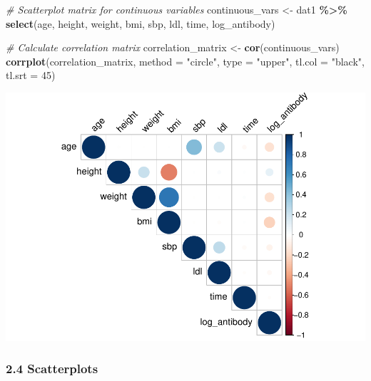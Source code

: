 \documentclass[
]{article}
\newenvironment{Shaded}{\begin{snugshade}}{\end{snugshade}}
\newcommand{\AttributeTok}[1]{\textcolor[rgb]{0.13,0.29,0.53}{#1}}
\newcommand{\CommentTok}[1]{\textcolor[rgb]{0.56,0.35,0.01}{\textit{#1}}}
\newcommand{\DecValTok}[1]{\textcolor[rgb]{0.00,0.00,0.81}{#1}}
\newcommand{\FunctionTok}[1]{\textcolor[rgb]{0.13,0.29,0.53}{\textbf{#1}}}
\newcommand{\NormalTok}[1]{#1}
\newcommand{\OtherTok}[1]{\textcolor[rgb]{0.56,0.35,0.01}{#1}}
\newcommand{\SpecialCharTok}[1]{\textcolor[rgb]{0.81,0.36,0.00}{\textbf{#1}}}
\newcommand{\StringTok}[1]{\textcolor[rgb]{0.31,0.60,0.02}{#1}}
\begin{document}
\begin{Shaded}
\begin{Highlighting}[]
\CommentTok{\# Scatterplot matrix for continuous variables}
\NormalTok{continuous\_vars }\OtherTok{\textless{}{-}}\NormalTok{ dat1 }\SpecialCharTok{\%\textgreater{}\%} 
  \FunctionTok{select}\NormalTok{(age, height, weight, bmi, sbp, ldl, time, log\_antibody)}

\CommentTok{\# Calculate correlation matrix}
\NormalTok{correlation\_matrix }\OtherTok{\textless{}{-}} \FunctionTok{cor}\NormalTok{(continuous\_vars)}
\FunctionTok{corrplot}\NormalTok{(correlation\_matrix, }\AttributeTok{method =} \StringTok{"circle"}\NormalTok{, }\AttributeTok{type =} \StringTok{"upper"}\NormalTok{, }
         \AttributeTok{tl.col =} \StringTok{"black"}\NormalTok{, }\AttributeTok{tl.srt =} \DecValTok{45}\NormalTok{)}
\end{Highlighting}
\end{Shaded}

\includegraphics{p8106_midterm_project_files/figure-latex/unnamed-chunk-12-1.pdf}

\subsubsection{2.4 Scatterplots}\label{scatterplots}
\end{document}
